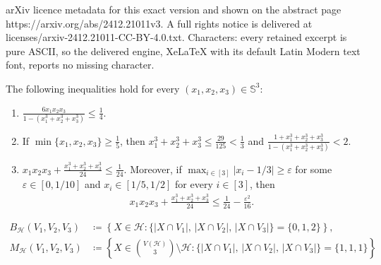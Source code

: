 \documentclass[10pt,a4paper]{amsart}
\newcommand{\C}[1]{\mathcal{#1}}
\begin{document}
arXiv licence metadata for this exact version and shown on the abstract page https://arxiv.org/abs/2412.21011v3. A full rights notice is delivered at licenses/arxiv-2412.21011-CC-BY-4.0.txt. Characters: every retained excerpt is pure ASCII, so the delivered engine, XeLaTeX with its default Latin Modern text font, reports no missing character.
\begin{fact}\label{FACT:ineqality}
    The following inequalities hold for every $(x_1, x_2, x_3) \in \mathbb{S}^{3}$$\colon$ 
    \begin{enumerate}[label=(\roman*)]
        \item\label{FACT:ineqality-1} $\frac{6x_1x_2x_3}{1-(x_1^3+x_2^3+x_3^3)} \le \frac{1}{4}$. 
        \item\label{FACT:ineqality-2} If $\min\{x_1, x_2, x_3\} \ge \frac{1}{5}$, then $x_1^3+x_2^3+x_3^3\le \frac{29}{125}<\frac13$ and $\frac{1+x_1^3+x_2^3+x_3^3}{1-(x_1^3+x_2^3+x_3^3)} < 2$. 
        \item\label{FACT:ineqality-3} $x_1 x_2 x_3 + \frac{x_1^3 + x_2^3 + x_3^3}{24} \le \frac{1}{24}$. Moreover, if $\max_{i\in [3]}\left|x_i - 1/3\right| \ge \varepsilon$ for some $\varepsilon \in [0, 1/10]$ and $x_i \in [1/5, 1/2]$ for every $i \in [3]$, then 
        \begin{align*}
            x_1 x_2 x_3 + \frac{x_1^3 + x_2^3 + x_3^3}{24}
            \le \frac{1}{24} - \frac{\varepsilon^2}{16}. 
        \end{align*}
    \end{enumerate}
\end{fact}

\begin{align}
    B_{\mathcal{H}}(V_1, V_2, V_3)
         &\coloneqq \left\{ X\in \C H\colon  \{|X\cap  V_1|,\,|X\cap V_2|,\, |X\cap V_3|\}=\{0,1,2\}\right\}, \label{equ:def-bad-triple}\\
    M_{\mathcal{H}}(V_1, V_2, V_3)
         &\coloneqq  \left\{ X\in {V(\C H)\choose 3}\setminus\C H\colon  \{|X\cap  V_1|,\,|X\cap V_2|,\, |X\cap V_3|\}=\{1,1,1\} \right\} \label{equ:def-missing-triple}
\end{align}
\end{document}
